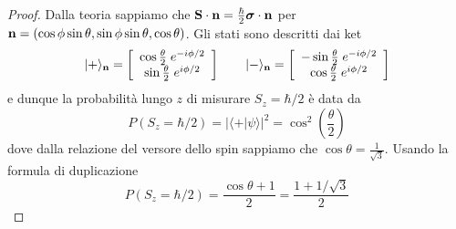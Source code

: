 \begin{proof}
	Dalla teoria sappiamo che  $\bold{S} \cdot \bold{n} = \frac{\hbar}{2} \boldsymbol{\sigma} \cdot \bold{n}$ per $\bold{n} = (\cos \phi \sin \theta, \sin \phi \sin \theta, \cos \theta )$. Gli stati sono descritti dai ket 
	\begin{equation*}
		|+ \rangle_{\bold{n}} = \left [ \begin{array}{c}
		\cos \frac{\theta}{2} \; e^{-i\phi/2}\\
		\sin \frac{\theta}{2} \; e^{i\phi/2}
	\end{array}\right] \quad \quad |- \rangle_{\bold{n}} = \left [\begin{array}{c}
		- \sin \frac{\theta}{2} \; e^{-i\phi/2} \\
		\cos \frac{\theta}{2} \; e^{i \phi/2}
	\end{array} \right]
	\end{equation*}
e dunque la probabilit\`a lungo $z$ di misurare $S_z = \hbar /2$ \`e data da
\begin{equation*}
	P(S_z = \hbar /2) = |\langle + | \psi \rangle |^2 = \cos^2 \left (\frac{\theta}{2} \right )
\end{equation*}	
dove dalla relazione del versore dello spin sappiamo che $\cos \theta = \frac{1}{\sqrt{3}}$. Usando la formula di duplicazione 
\begin{equation*}
	P(S_z = \hbar/2) = \frac{\cos\theta + 1}{2} = \frac{1 + 1/ \sqrt{3}}{2}
\end{equation*}
\end{proof}

